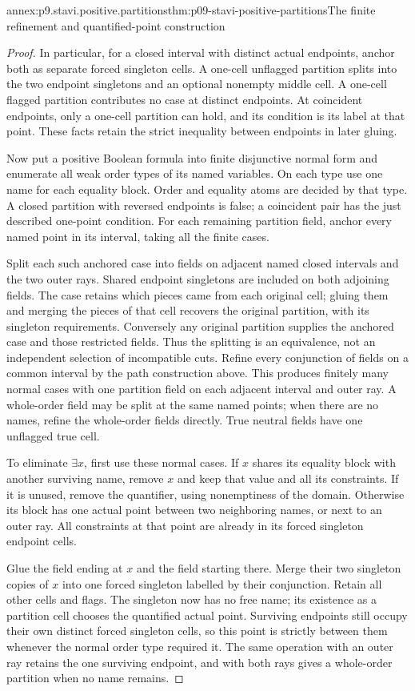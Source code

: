 \begin{annexitem}{annex:p9.stavi.positive.partitions}{thm:p09-stavi-positive-partitions}{The finite refinement and quantified-point construction}
\begin{proof}
In particular, for a closed
interval with distinct actual
endpoints, anchor both as
separate forced singleton
cells. A one-cell unflagged
partition splits into the
two endpoint singletons and
an optional nonempty middle
cell. A one-cell flagged
partition contributes no
case at distinct endpoints.
At coincident endpoints,
only a one-cell partition
can hold, and its condition
is its label at that point.
These facts retain the
strict inequality between
endpoints in later gluing.

Now put a positive Boolean
formula into finite disjunctive
normal form and enumerate
all weak order types of
its named variables. On
each type use one name
for each equality block.
Order and equality atoms
are decided by that type.
A closed partition with
reversed endpoints is
false; a coincident pair
has the just described
one-point condition.
For each remaining
partition field, anchor
every named point in
its interval, taking
all the finite cases.

Split each such anchored
case into fields on
adjacent named closed
intervals and the two
outer rays. Shared
endpoint singletons
are included on both
adjoining fields.
The case retains which
pieces came from each
original cell; gluing
them and merging the
pieces of that cell
recovers the original
partition, with its
singleton requirements.
Conversely any original
partition supplies the
anchored case and those
restricted fields.
Thus the splitting is
an equivalence, not
an independent selection
of incompatible cuts.
Refine every conjunction
of fields on a common
interval by the path
construction above.
This produces finitely
many normal cases with
one partition field on
each adjacent interval
and outer ray. A
whole-order field may
be split at the same
named points; when
there are no names,
refine the whole-order
fields directly.
True neutral fields
have one unflagged
true cell.

To eliminate \(\exists x\),
first use these normal
cases. If \(x\) shares
its equality block
with another surviving
name, remove \(x\)
and keep that value
and all its constraints.
If it is unused,
remove the quantifier,
using nonemptiness
of the domain.
Otherwise its block
has one actual
point between two
neighboring names,
or next to an
outer ray. All
constraints at that
point are already
in its forced
singleton endpoint
cells.

Glue the field ending
at \(x\) and the
field starting there.
Merge their two
singleton copies of
\(x\) into one
forced singleton
labelled by their
conjunction. Retain
all other cells
and flags. The
singleton now has
no free name; its
existence as a
partition cell
chooses the
quantified actual
point. Surviving
endpoints still
occupy their own
distinct forced
singleton cells,
so this point
is strictly between
them whenever the
normal order type
required it.
The same operation
with an outer
ray retains the
one surviving
endpoint, and
with both rays
gives a whole-order
partition when
no name remains.


\end{proof}
\end{annexitem}
